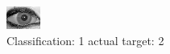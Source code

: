 \begin{figure}[h!]
\begin{center}
\includegraphics[width=0.60\columnwidth]{figures/ID2016_class_1_target_2.png}
\end{center}
\caption{ Classification: 1 actual target: 2}
\label{fig:ID2016_class_1_target_2}
\end{figure}
